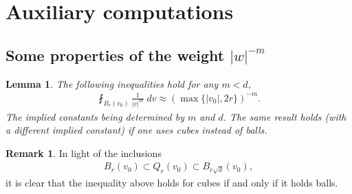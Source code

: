\documentclass[12pt,american]{amsart}
\numberwithin{equation}{section}
\theoremstyle{plain}
\newtheorem{lem}[thm]{Lemma}
\theoremstyle{definition}                  %
\newtheorem{rem}[thm]{Remark}
\begin{document}
 




\appendix

\section{Auxiliary computations}\label{sec:Auxiliary Computations}
	
\subsection{Some properties of the weight $|w|^{-m}$} 

\begin{lem}\label{lem:averages for powers of v}
 The following inequalities hold for any $m < d $, 
 \begin{align*}
  \fint_{B_r(v_0)} \frac{1}{|v|^{m}}\;dv \approx \left (\max\{ |v_0|,2r\}\right )^{-m}.
  \end{align*}
  The implied constants being determined by $m$ and $d$. The same result holds (with a different implied constant) if one uses cubes instead of balls.
\end{lem}

\begin{rem}\label{rem:cubes versus balls}
  In light of the inclusions
  \begin{align*}
    B_r(v_0) \subset Q_r(v_0) \subset B_{r\sqrt{d}}(v_0),
  \end{align*}	  
  it is clear that the inequality above holds for cubes if and only if it holds balls.
\end{rem}
\end{document}
